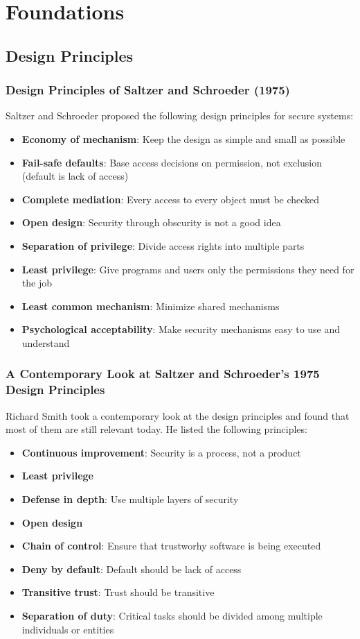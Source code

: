 \documentclass[12pt,A4]{extarticle}
\begin{document}
\section{Foundations}
\subsection{Design Principles}
\subsubsection{Design Principles of Saltzer and Schroeder (1975)}
Saltzer and Schroeder \cite{salzer1975protection} proposed the following design principles for secure systems:
\begin{itemize}
  \item{\textbf{Economy of mechanism}: Keep the design as simple and small as possible}
  \item{\textbf{Fail-safe defaults}: Base access decisions on permission, not exclusion (default is lack of access)}
  \item{\textbf{Complete mediation}: Every access to every object must be checked}
  \item{\textbf{Open design}: Security through obscurity is not a good idea}
  \item{\textbf{Separation of privilege}: Divide access rights into multiple parts}
  \item{\textbf{Least privilege}: Give programs and users only the permissions they need for the job}
  \item{\textbf{Least common mechanism}: Minimize shared mechanisms}
  \item{\textbf{Psychological acceptability}: Make security mechanisms easy to use and understand}
\end{itemize}

\subsubsection{A Contemporary Look at Saltzer and Schroeder's 1975 Design Principles}
Richard Smith \cite{AContemporaryLookAtSaltzerAndSchroeders1975DesignPrinciples} took a contemporary look at the design principles and found that most of them are still relevant today. He listed the following principles:
\begin{itemize}
  \item{\textbf{Continuous improvement}: Security is a process, not a product}
  \item{\textbf{Least privilege}}
  \item{\textbf{Defense in depth}: Use multiple layers of security}
  \item{\textbf{Open design}}
  \item{\textbf{Chain of control}: Ensure that trustworhy software is being executed}
  \item{\textbf{Deny by default}: Default should be lack of access}
  \item{\textbf{Transitive trust}: Trust should be transitive}
  \item{\textbf{Separation of duty}: Critical tasks should be divided among multiple individuals or entities}
\end{itemize}
\end{document}
